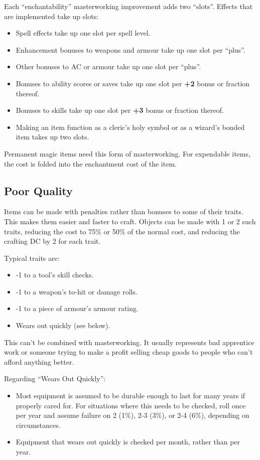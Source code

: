 Each ``enchantability'' masterworking improvement adds two ``slots''.
Effects that are implemented take up slots:
\begin{itemize}
\item Spell effects take up one slot per spell level.
\item Enhancement bonuses to weapons and armour take up one slot per ``plus''.
\item Other bonuses to AC or armour take up one slot per ``plus''.
\item Bonuses to ability scores or saves take up one slot per \textbf{+2}
bonus or fraction thereof.
\item Bonuses to skills take up one slot per \textbf{+3} bonus or fraction
thereof.
\item Making an item function as a cleric's holy symbol or as a wizard's
bonded item takes up two slots.
\end{itemize}

Permanent magic items need this form of masterworking. For expendable items,
the cost is folded into the enchantment cost of the item.
%

%
\subsection{Poor Quality}

Items can be made with penalties rather than bonuses to some of their
traits. This makes them easier and faster to craft. Objects can be made
with 1 or 2 such traits, reducing the cost to 75\% or 50\% of the normal
cost, and reducing the crafting DC by 2 for each trait.

Typical traits are:
\begin{itemize}
\item -1 to a tool's skill checks.
\item -1 to a weapon's to-hit or damage rolls.
\item -1 to a piece of armour's armour rating.
\item Wears out quickly (see below).
\end{itemize}

This can't be combined with masterworking. It usually represents bad
apprentice work or someone trying to make a profit selling cheap goods to
people who can't afford anything better.

Regarding ``Wears Out Quickly'':
\begin{itemize}
\item Most equipment is assumed to be durable enough to last for many years
if properly cared for. For situations where this needs to be checked, roll
once per year and assume failure on 2 (1\%), 2-3 (3\%), or 2-4 (6\%),
depending on circumstances.
\item Equipment that wears out quickly is checked per month, rather than
per year.
\end{itemize}
%

